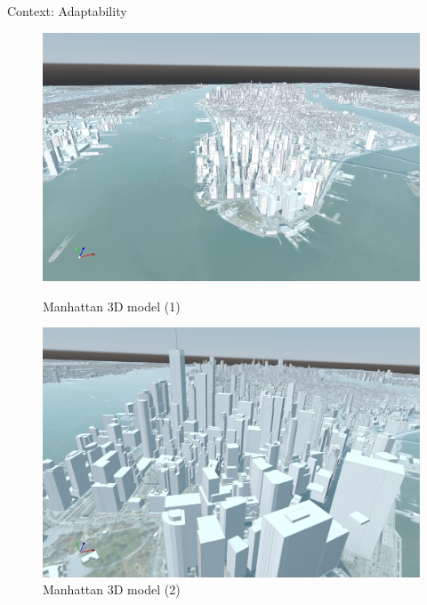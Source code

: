 \documentclass[10pt]{beamer}
\begin{document}
\begin{frame}{Context: Adaptability}
  \begin{figure}[H]
    \centering
    \begin{minipage}{0.49\textwidth}
      \centering
      \includegraphics[width=\textwidth]{images/manhattan-mesh-1.png}
      \caption{Manhattan 3D model (1)}
    \end{minipage}
    \hfill
    \begin{minipage}{0.49\textwidth}
      \centering
      \includegraphics[width=\textwidth]{images/manhattan-mesh-2.png}
      \caption{Manhattan 3D model (2)}
    \end{minipage}
  \end{figure}
\end{frame}  
\end{document}
